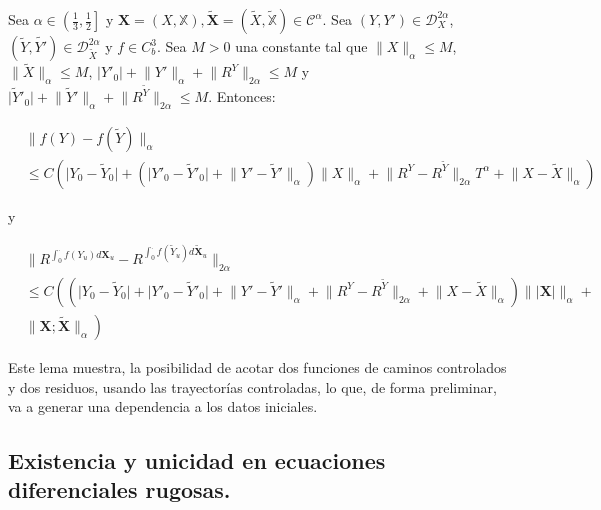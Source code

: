\begin{lema}
	Sea $\alpha \in \left( \frac{1}{3}, \frac{1}{2} \right]$ y $\mathbf{X} = (X, \mathbb{X}),  \tilde{ \mathbf{X} } = (\tilde{X}, \tilde{ \mathbb{X} }) \in \mathscr{C}^{\alpha} $. Sea $(Y, Y') \in \mathscr{D}^{2\alpha}_X$, $(\tilde{Y}, \tilde{Y'}) \in \mathscr{D}^{2\alpha}_{ \tilde{X} }$ y $f \in C^3_b$. Sea $M > 0$ una constante tal que $\lVert X \rVert_{\alpha} \leq M$, $\lVert \tilde{X} \rVert_{\alpha} \leq M$, $\lvert Y'_0 \rvert + \lVert Y' \rVert_{\alpha} + \lVert R^Y \rVert_{2\alpha} \leq M$ y $\lvert \tilde{Y}'_0 \rvert + \lVert \tilde{Y}' \rVert_{\alpha} + \lVert R^{ \tilde{Y} } \rVert_{2\alpha} \leq M$. Entonces:

	\begin{align*}
		&\lVert f(Y) - f( \tilde{Y} ) \rVert_{\alpha} \\
		&\leq C \left(  \lvert Y_0 - \tilde{Y}_0 \rvert + ( \lvert Y'_0 - \tilde{Y}'_0 \rvert +  \lVert Y' - \tilde{Y}' \rVert_{\alpha}  )  \lVert X \rVert_{\alpha}  + \lVert R^Y - R^{\tilde{Y}} \rVert_{2\alpha} T^{\alpha} + \lVert X - \tilde{X} \rVert_{\alpha}   \right)
	\end{align*}

	y

	\begin{align*}
		&\lVert R^{ \int_0^{\cdot} f(Y_u) d\mathbf{X}_u  } - R^{ \int_0^{\cdot} f( \tilde{Y}_u ) d\tilde{ \mathbf{ {X} }}_u }  \rVert_{2\alpha} \\
		&\leq C \left(  ( \lvert Y_0 - \tilde{Y}_0 \rvert + \lvert Y'_0 - \tilde{Y}'_0 \rvert  + \lVert  Y' - \tilde{Y}' \rVert_{\alpha} + \lVert  R^Y - R^{\tilde{Y}}  \rVert_{2\alpha}  + \lVert  X - \tilde{X} \rVert_{\alpha} )  \lVert \lvert \mathbf{X} \rvert \rVert_{\alpha} + \right. \\
		&\left. \lVert \mathbf{X}; \tilde{\mathbf{X}} \rVert_{\alpha}  \right)
	\end{align*}


\end{lema}


Este lema muestra, la posibilidad de acotar dos funciones de caminos controlados y dos residuos, usando las trayectorías controladas, lo que, de forma preliminar, va a generar una dependencia a los datos iniciales.

\subsection{Existencia y unicidad en ecuaciones diferenciales rugosas.}

